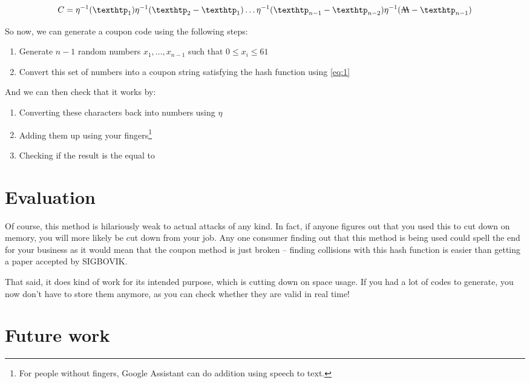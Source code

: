 \documentclass{article}
\newcommand{\M}{\rotatebox[origin=c]{180}{\textwon}}
\begin{document}
\begin{multicols}{2}
\begin{equation}
C = \eta^{-1}(\text{\texthtp}_1) \eta^{-1}(\text{\texthtp}_2 - \text{\texthtp}_1) \dots \eta^{-1}(\text{\texthtp}_{n-1} - \text{\texthtp}_{n-2}) \eta^{-1}(\text{\M} - \text{\texthtp}_{n-1})\label{eq:1}
\end{equation}

So now, we can generate a coupon code using the following steps:

\begin{enumerate}
	\item Generate $n-1$ random numbers $x_1, \dots, x_{n-1}$ such that $0 \leq x_i \leq 61$
	\item Convert this set of numbers into a coupon string satisfying the hash function using \eqref{eq:1}
\end{enumerate}

And we can then check that it works by:

\begin{enumerate}
	\item Converting these characters back into numbers using $\eta$
	\item Adding them up using your fingers\footnote{For people without fingers, Google Assistant can do addition using speech to text.}
	\item Checking if the result is the equal to \M
\end{enumerate}

\section{Evaluation}

Of course, this method is hilariously weak to actual attacks of any kind. In fact, if anyone figures out that you used this to cut down on memory, you will more likely be cut down from your job. Any one consumer finding out that this method is being used could spell the end for your business as it would mean that the coupon method is just broken -- finding collisions with this hash function is easier than getting a paper accepted by SIGBOVIK. 

That said, it does kind of work for its intended purpose, which is cutting down on space usage. If you had a lot of codes to generate, you now don't have to store them anymore, as you can check whether they are valid in real time!

\section{Future work}


\end{multicols}
\end{document}
